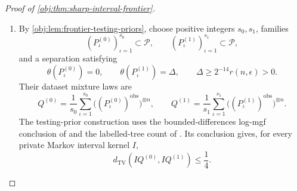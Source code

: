 \begin{proof}[Proof of \cref{obj:thm:sharp-interval-frontier}]
\begin{enumerate}
For every possible value of the joint release in
\cref{obj:def:private-ratio}, define
\[
\mathcal A=nh\min\{1,n\delta\},
\qquad
d_0=\frac{3\mathcal A}{64},
\qquad
B_D=\max\{d_0,\widetilde S_D\},
\qquad
B_N=\operatorname{clip}_{[-B_D,B_D]}(\widetilde S_N),
\qquad
\rho=\sqrt{10V(h,\delta)}.
\]
Because \(n,h,\delta>0\),
\[
\mathcal A>0,
\qquad
B_D\ge d_0>0,
\qquad
\rho\ge0.
\]
Division by the positive \(B_D\) preserves minima and maxima, so
\[
\frac{B_N}{B_D}
=
\frac{\max\{-B_D,\min\{B_D,\widetilde S_N\}\}}{B_D}
=
\max\left\{-1,\min\left\{1,\frac{\widetilde S_N}{B_D}\right\}\right\}
=
\widehat T_{h,k}.
\]
Consequently, the accepted candidate set is
\[
\begin{aligned}
\mathcal V_{\mathrm{acc}}
&=
\left\{\vartheta\in[-1,1]:
|B_N-\vartheta B_D|\le\rho B_D\right\}\\
&=
\left\{\vartheta\in[-1,1]:
\left|\frac{B_N}{B_D}-\vartheta\right|\le\rho\right\}\\
&=
\left[
\max\{-1,\widehat T_{h,k}-\rho\},
\min\{1,\widehat T_{h,k}+\rho\}
\right].
\end{aligned}
\]
Indeed, the absolute-value inequality is equivalent to
\(\widehat T_{h,k}-\rho\le\vartheta\le\widehat T_{h,k}+\rho\).
Moreover,
\[
-1\le\widehat T_{h,k}\le1,
\qquad
\max\{-1,\widehat T_{h,k}-\rho\}
\le\widehat T_{h,k}
\le
\min\{1,\widehat T_{h,k}+\rho\}.
\]
Thus the accepted set is a nonempty closed interval, and its hull has exactly these endpoints. The two constructions apply equal measurable interval maps to the same joint release. Together with the constant branch, this proves
\[
I^*_{n,\epsilon}=\widehat I^*.
\]

\item By \cref{obj:lem:frontier-testing-priors}, choose positive integers \(s_0,s_1\), families
\[
(P^{(0)}_\iota)_{\iota=1}^{s_0}\subset\mathcal P,
\qquad
(P^{(1)}_\iota)_{\iota=1}^{s_1}\subset\mathcal P,
\]
and a separation satisfying
\[
\theta(P^{(0)}_\iota)=0,
\qquad
\theta(P^{(1)}_\iota)=\Delta,
\qquad
\Delta\ge2^{-14}r(n,\epsilon)>0.
\]
Their dataset mixture laws are
\[
Q^{(0)}
=
\frac1{s_0}\sum_{\iota=1}^{s_0}
\bigl((P^{(0)}_\iota)^{\mathrm{obs}}\bigr)^{\otimes n},
\qquad
Q^{(1)}
=
\frac1{s_1}\sum_{\iota=1}^{s_1}
\bigl((P^{(1)}_\iota)^{\mathrm{obs}}\bigr)^{\otimes n}.
\]
The testing-prior construction uses the bounded-differences log-mgf conclusion of
\citep[Theorem 6.2, proof, printed p.~167]{BoucheronLugosiMassart2013}
and the labelled-tree count of
\citep[Section 5.6, Theorem 5.40]{KellerTrotterAppliedCombinatorics}.
Its conclusion gives, for every private Markov interval kernel \(I\),
\[
d_{\mathrm{TV}}(IQ^{(0)},IQ^{(1)})\le\frac14.
\]


\end{enumerate}
\end{proof}
